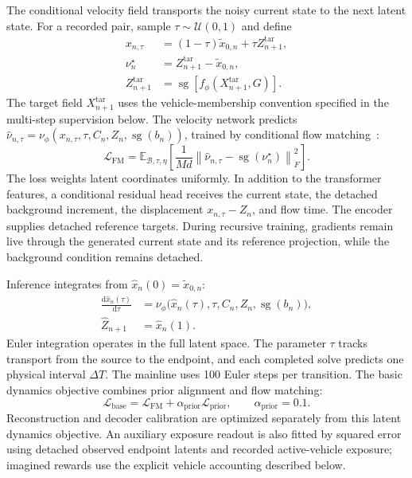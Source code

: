 The conditional velocity field transports the noisy current state to the
next latent state. For a recorded pair, sample
$\tau\sim\mathcal U(0,1)$ and define
\begin{equation}
 \begin{aligned}
 x_{n,\tau}&=(1-\tau)\tilde x_{0,n}
                  +\tau Z_{n+1}^{\mathrm{tar}},\\
 \nu_n^\star&=Z_{n+1}^{\mathrm{tar}}-\tilde x_{0,n},\\
 Z_{n+1}^{\mathrm{tar}}
   &=\operatorname{sg}[f_\phi(X_{n+1}^{\mathrm{tar}},G)].
 \end{aligned}
 \label{eq:conditional-fm-path}
\end{equation}
The target field $X_{n+1}^{\mathrm{tar}}$ uses the vehicle-membership
convention specified in the multi-step supervision below.
The velocity network predicts
$\widehat\nu_{n,\tau}
 =\nu_\phi(x_{n,\tau},\tau,C_n,Z_n,\operatorname{sg}(b_n))$,
trained by conditional flow matching~\cite{lipman2023flow}:
\begin{equation}
 \mathcal L_{\mathrm{FM}}
   =\mathbb E_{\mathcal B,\tau,\eta}\!\left[
       \frac1{Md}
       \left\|\widehat\nu_{n,\tau}
                  -\operatorname{sg}(\nu_n^\star)\right\|_F^2
     \right].
 \label{eq:conditional-fm-loss}
\end{equation}
The loss weights latent coordinates uniformly. In addition to the
transformer features, a conditional residual head receives the current
state, the detached background increment, the displacement
$x_{n,\tau}-Z_n$, and flow time. The encoder supplies detached reference
targets. During recursive training, gradients remain live through the
generated current state and its reference projection, while the background
condition remains detached.

Inference integrates from $\hat x_n(0)=\tilde x_{0,n}$:
\begin{equation}
 \begin{aligned}
 \frac{\mathrm d\hat x_n(\tau)}{\mathrm d\tau}
   &=\nu_\phi\bigl(\hat x_n(\tau),\tau,C_n,Z_n,
                         \operatorname{sg}(b_n)\bigr),\\
 \widehat Z_{n+1}&=\hat x_n(1).
 \end{aligned}
 \label{eq:conditional-fm-ode}
\end{equation}
Euler integration operates in the full latent space. The parameter $\tau$
tracks transport from the source to the endpoint, and each completed solve
predicts one physical interval $\Delta T$. The mainline uses 100 Euler
steps per transition. The basic dynamics objective combines prior
alignment and flow matching:
\begin{equation}
 \mathcal L_{\mathrm{base}}
   =\mathcal L_{\mathrm{FM}}
      +\alpha_{\mathrm{prior}}\mathcal L_{\mathrm{prior}},
 \qquad \alpha_{\mathrm{prior}}=0.1.
 \label{eq:base-world-model-loss}
\end{equation}
Reconstruction and decoder calibration are optimized separately from
this latent dynamics objective. An auxiliary exposure readout is also
fitted by squared error using detached observed endpoint latents and
recorded active-vehicle exposure; imagined rewards use the explicit
vehicle accounting described below.

